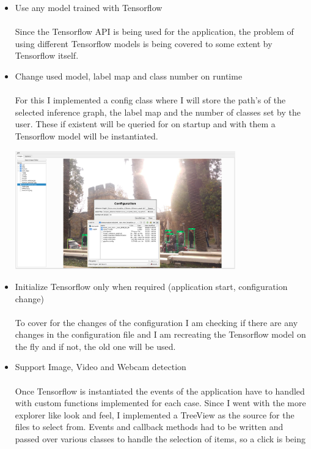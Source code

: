 \begin{itemize}
    \item Use any model trained with Tensorflow \\ \\
        Since the Tensorflow API is being used for the application, the problem of using different Tensorflow models is being covered to
        some extent by Tensorflow itself.
    \newpage \noindent
    \item Change used model, label map and class number on runtime \\ \\
        For this I implemented a config class where I will store the path's of the selected inference graph, the label map and the
        number of classes set by the user. These if existent will be queried for on startup and with them a Tensorflow model will be instantiated.\\
        \begin{center}
            \includegraphics[width=0.75\textwidth]{images/application/application_config.png}
        \end{center}
    \item Initialize Tensorflow only when required (application start, configuration change)\\ \\
        To cover for the changes of the configuration I am checking if there are any changes in the configuration file and I am recreating the
        Tensorflow model on the fly and if not, the old one will be used.
    \item Support Image, Video and Webcam detection \\ \\
        Once Tensorflow is instantiated the events of the application have to handled with custom functions implemented for each case.
        Since I went with the more explorer like look and feel, I implemented a TreeView as the source for the files to select from.
        Events and callback methods had to be written and passed over various classes to handle the selection of items, so a click is being

\end{itemize}
